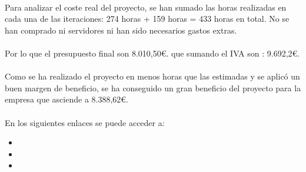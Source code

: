 
\paragraph{} Para analizar el coste real del proyecto, se han sumado las horas realizadas en  cada una de las iteraciones: 274 horas + 159 horas = 433 horas en total. No se han comprado ni servidores ni han sido necesarios gastos extras.  

\paragraph{} Por lo que el presupuesto final son 8.010,50\euro. que sumando el IVA son : 9.692,2\euro.

\paragraph{} Como se ha realizado el proyecto en menos horas que las estimadas y se aplicó un buen margen de beneficio, se ha conseguido un gran beneficio del proyecto para la empresa que asciende a 8.388,62\euro.

\paragraph{}En los siguientes enlaces se puede acceder a:
\begin{itemize}
	\item {}
	\item {}
	\item {}
\end{itemize}